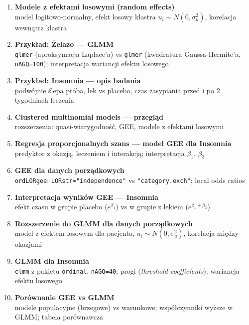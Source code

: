 \documentclass[a4paper,11pt]{article}
\begin{document}
\vspace{0.4em}
\begin{enumerate}[label=\textbf{\arabic*.}, leftmargin=1.8em, itemsep=3pt, topsep=2pt]
  \item \textbf{Modele z efektami losowymi (random effects)}\\
        {\small\color{medgray}model logitowo-normalny, efekt losowy klastra $u_i \sim N(0,\sigma_u^2)$, korelacja wewnątrz klastra}
  \item \textbf{Przykład: Żelazo --- GLMM}\\
        {\small\color{medgray}\texttt{glmer} (aproksymacja Laplace'a) vs \texttt{glmer} (kwadratura Gaussa-Hermite'a, \texttt{nAGQ=100}); interpretacja wariancji efektu losowego}
  \item \textbf{Przykład: Insomnia --- opis badania}\\
        {\small\color{medgray}podwójnie ślepa próba, lek vs placebo, czas zasypiania przed i po 2 tygodniach leczenia}
  \item \textbf{Clustered multinomial models --- przegląd}\\
        {\small\color{medgray}rozszerzenia: quasi-wiarygodność, GEE, modele z efektami losowymi}
  \item \textbf{Regresja proporcjonalnych szans --- model GEE dla Insomnia}\\
        {\small\color{medgray}predyktor z okazją, leczeniem i interakcją; interpretacja $\beta_1$, $\beta_3$}
  \item \textbf{GEE dla danych porządkowych}\\
        {\small\color{medgray}\texttt{ordLORgee}: \texttt{LORstr="independence"} vs \texttt{"category.exch"}; local odds ratios}
  \item \textbf{Interpretacja wyników GEE --- Insomnia}\\
        {\small\color{medgray}efekt czasu w grupie placebo ($e^{\beta_1}$) vs w grupie z lekiem ($e^{\beta_1+\beta_3}$)}
  \item \textbf{Rozszerzenie do GLMM dla danych porządkowych}\\
        {\small\color{medgray}model z efektem losowym dla pacjenta, $u_i \sim N(0,\sigma_u^2)$, korelacja między okazjami}
  \item \textbf{GLMM dla Insomnia}\\
        {\small\color{medgray}\texttt{clmm} z pakietu \texttt{ordinal}, \texttt{nAGQ=40}; progi (\textit{threshold coefficients}); wariancja efektu losowego}
  \item \textbf{Porównanie GEE vs GLMM}\\
        {\small\color{medgray}modele populacyjne (brzegowe) vs warunkowe; współczynniki wyższe w GLMM; tabela porównawcza}
\end{enumerate}
\end{document}

